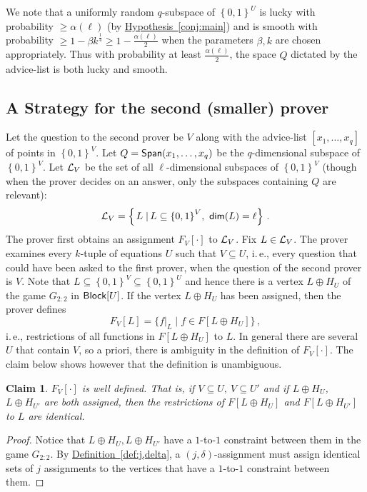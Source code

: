 \documentclass[11pt]{article}
\numberwithin{equation}{section}
\newtheorem{claim}[theorem]{Claim}
\theoremstyle{definition}
\theoremstyle{plain}
\newcommand{\ie}{i.\,e.}
\newcommand{\expref}[2]{\hyperref[#2]{#1~\ref{#2}}}
\newcommand\sett[2]{\left\{ \left. #1 \;\right\vert #2 \right\}}
\newcommand\set[1]{{\left\{ #1 \right\}}}
\newcommand\power[1]{\set{0,1}^{#1}}
\newcommand*\xor{\mathbin{\oplus}}
\renewcommand\geq{\geqslant}
\begin{document}
We note that a uniformly random $q$-subspace of $\power{U}$ is lucky with probability $\geq \alpha(\ell)$ (by \expref{Hypothesis}{conj:main})
and is smooth with probability $\geq 1-\beta k^{\frac{1}{4}} \geq 1- \frac{\alpha(\ell)}{2}$ when the parameters $\beta, k$ are
chosen appropriately.
Thus with probability at least $\frac{\alpha(\ell)}{2}$, the space $Q$ dictated by the advice-list is both lucky and smooth.


\subsection{A Strategy for the second (smaller) prover}
Let the question to the second prover be $V$ along with the advice-list  $[x_1, \ldots, x_q]$ of points in $\power{V}$. Let
$Q = {\sf Span}(x_1,\ldots,x_q)$ be the $q$-dimensional subspace of $\power{V}$. Let ${\cal L}_V$ be the set of all $\ell$-dimensional
subspaces of $\power{V}$ (though when the prover decides on an answer, only the subspaces containing $Q$ are relevant):
\[
{\cal L}_V =\sett{L}{L\subseteq \power{V}, ~{\sf dim}(L)=\ell}\,.%
\]
The prover first obtains an assignment $F_V[\cdot]$ to ${\cal L}_V$. Fix
 $L\in {\cal L}_V$. The prover examines every $k$-tuple of equations $U$ such that $V \subseteq U$, \ie, every question that could
 have been asked to the
 first prover, when the question of the second prover is $V$. Note that $L \subseteq \power{V} \subseteq \power{U}$ and hence there is a vertex $L\xor H_U$
 of the game $G_{2:2}$ in ${\sf Block}[U]$. If the vertex $L\xor H_U$ has been assigned, then the prover defines
\[
F_V[L]  = \{ f|_L  \mid f \in F[L\xor H_U] \}\,,%
\]
\ie, restrictions of all functions in $F[L\xor H_U]$ to $L$. In general there are several $U$ that contain $V$, so a priori, there is ambiguity
in the definition of $F_V[\cdot]$. The claim below shows however that the definition is unambiguous.
\begin{claim}
$F_{V}[\cdot]$ is well defined. That is, if $V \subseteq U, ~V \subseteq U'$ and if $L\xor H_{U}$, ~$L\xor H_{U'}$ are both assigned, then the
restrictions of $F[L\xor H_{U}]$ and $F[L\xor H_{U'}]$ to $L$ are identical.
\end{claim}
\begin{proof}
Notice that $L\xor H_{U}, L\xor H_{U'}$ have a $1$-to-$1$ constraint between them in the game $G_{2:2}$. By \expref{Definition}{def:j,delta}, a $(j,\delta)$-assignment
must assign identical sets of $j$ assignments to the vertices that have a $1$-to-$1$ constraint between them.
\end{proof}
\end{document}
